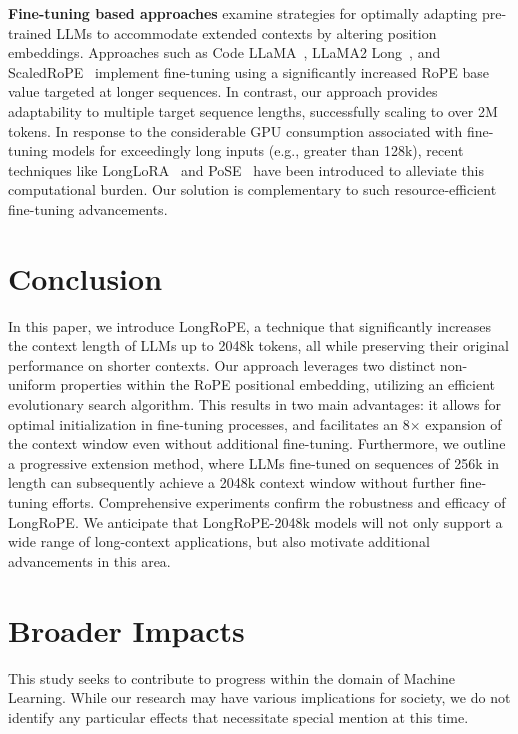 \textbf{Fine-tuning based approaches} examine strategies for optimally adapting pre-trained LLMs to accommodate extended contexts by altering position embeddings. Approaches such as Code LLaMA~\cite{codellama}, LLaMA2 Long~\cite{xiong2023effective}, and ScaledRoPE~\cite{liu2023scaling} implement fine-tuning using a significantly increased RoPE base value targeted at longer sequences. In contrast, our approach provides adaptability to multiple target sequence lengths, successfully scaling to over 2M tokens. In response to the considerable GPU consumption associated with fine-tuning models for exceedingly long inputs (e.g., greater than 128k), recent techniques like LongLoRA~\cite{longlora} and PoSE~\cite{zhu2023pose} have been introduced to alleviate this computational burden. Our solution is complementary to such resource-efficient fine-tuning advancements.

\section{Conclusion}

In this paper, we introduce LongRoPE, a technique that significantly increases the context length of LLMs up to 2048k tokens, all while preserving their original performance on shorter contexts. Our approach leverages two distinct non-uniform properties within the RoPE positional embedding, utilizing an efficient evolutionary search algorithm. This results in two main advantages: it allows for optimal initialization in fine-tuning processes, and facilitates an 8$\times$ expansion of the context window even without additional fine-tuning. Furthermore, we outline a progressive extension method, where LLMs fine-tuned on sequences of 256k in length can subsequently achieve a 2048k context window without further fine-tuning efforts. Comprehensive experiments confirm the robustness and efficacy of LongRoPE. We anticipate that LongRoPE-2048k models will not only support a wide range of long-context applications, but also motivate additional advancements in this area.

\section*{Broader Impacts} This study seeks to contribute to progress within the domain of Machine Learning. While our research may have various implications for society, we do not identify any particular effects that necessitate special mention at this time.

	\balance

